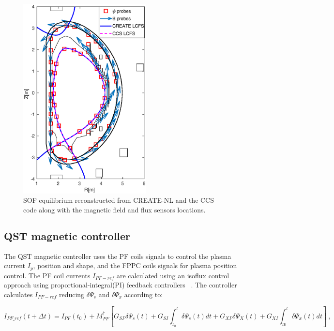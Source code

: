 \begin{figure}
	\centering
	\includegraphics[width=0.6\textwidth]{Chp3/sensors_plots_newDirection.eps}
	\caption{SOF equilibrium reconstructed from CREATE-NL and the CCS code along with the  magnetic field and flux sensors locations.	\label{JT60sensors} }
\end{figure}


\subsection{QST magnetic controller }


The QST magnetic controller  uses the PF coils signals to control the plasma current $I_p$, position and shape, and the FPPC coils signals for plasma position control. The PF coil currents $I_{PF-ref}$ are calculated using an isoflux control approach using proportional-integral(PI) feedback controllers   ~\cite{FBC}. The controller calculates $I_{PF-ref}$ reducing $\delta\Psi_s$ and $\delta\Psi_x$ according to:



\begin{equation}
I_{PF\_ref}(t+\Delta t) = I_{PF}(t_0)+M^\dagger_{PF}\left[G_{SP}\delta\Psi_s(t)+G_{SI}\int_{t_0}^{t}\delta\Psi_s(t)dt+G_{XP}\delta\Psi_X(t)+G_{XI}\int_{t0}^{t}\delta\Psi_x(t)dt\right]~,
\end{equation}

